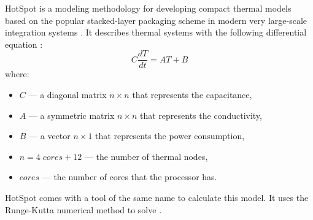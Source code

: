 HotSpot is a modeling methodology for developing compact thermal models based on the popular stacked-layer packaging scheme in modern very large-scale integration systems \cite{huang2006}. It describes thermal systems with the following differential equation \cite{rao2008}:
\begin{equation} \label{eq:initial}
  C \frac{dT}{dt} = AT + B
\end{equation}
where:
\begin{itemize}
  \item $C$ --- a diagonal matrix $n \times n$ that represents the capacitance,
  \item $A$ --- a symmetric matrix $n \times n$ that represents the conductivity,
  \item $B$ --- a vector $n \times 1$ that represents the power consumption,
  \item $n = 4 \; cores + 12$ --- the number of thermal nodes,
  \item $cores$ --- the number of cores that the processor has.
\end{itemize}

HotSpot comes with a tool of the same name to calculate this model. It uses the Runge-Kutta numerical method to solve .
